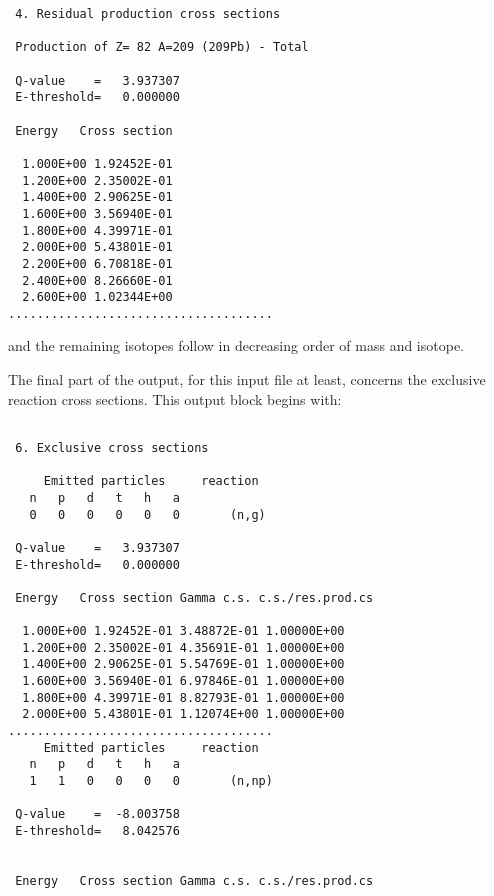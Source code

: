\begin{samplecase}
{\begin{verbatim}
 4. Residual production cross sections
  
 Production of Z= 82 A=209 (209Pb) - Total
  
 Q-value    =   3.937307
 E-threshold=   0.000000
  
 Energy   Cross section 
  
  1.000E+00 1.92452E-01            
  1.200E+00 2.35002E-01            
  1.400E+00 2.90625E-01            
  1.600E+00 3.56940E-01            
  1.800E+00 4.39971E-01            
  2.000E+00 5.43801E-01            
  2.200E+00 6.70818E-01            
  2.400E+00 8.26660E-01            
  2.600E+00 1.02344E+00 
.....................................
\end{verbatim} } \renewcommand{\baselinestretch}{1.07}\small\normalsize
\noindent
and the remaining isotopes follow in decreasing order of mass and isotope.

The final part of the output, for this input file at least, concerns the
exclusive reaction cross sections. This output block begins with:

{\small \begin{verbatim}

 6. Exclusive cross sections

     Emitted particles     reaction
   n   p   d   t   h   a
   0   0   0   0   0   0       (n,g)            

 Q-value    =   3.937307
 E-threshold=   0.000000
  
 Energy   Cross section Gamma c.s. c.s./res.prod.cs
  
  1.000E+00 1.92452E-01 3.48872E-01 1.00000E+00
  1.200E+00 2.35002E-01 4.35691E-01 1.00000E+00
  1.400E+00 2.90625E-01 5.54769E-01 1.00000E+00
  1.600E+00 3.56940E-01 6.97846E-01 1.00000E+00
  1.800E+00 4.39971E-01 8.82793E-01 1.00000E+00
  2.000E+00 5.43801E-01 1.12074E+00 1.00000E+00
.....................................
     Emitted particles     reaction
   n   p   d   t   h   a
   1   1   0   0   0   0       (n,np)           

 Q-value    =  -8.003758   
 E-threshold=   8.042576


 Energy   Cross section Gamma c.s. c.s./res.prod.cs


\end{verbatim}}
\end{samplecase}
